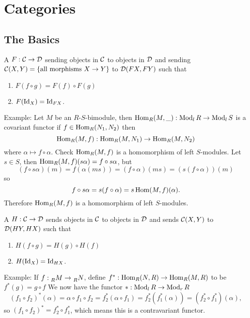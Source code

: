 \chapter{Categories}

\section{The Basics}

  \begin{define}
    A  $F:\mathcal{C}\to \mathcal{D}$ sending objects in $\mathcal{C}$ to objects
    in $\mathcal{D}$ and sending $\mathcal{C}(X,Y) = \{ \text{all morphisms } X\to Y\}$ to
    $\mathcal{D}(FX, FY)$ such that
    \begin{enumerate}
      \item $F(f\circ g) = F(f)\circ F(g)$
      \item $F(\operatorname{Id}_X) = \operatorname{Id}_{FX}$.
    \end{enumerate}
  \end{define}

  Example: Let $M$ be an $R$-$S$-bimodule, then
  $\operatorname{Hom}_R(M,\_): \operatorname{Mod}_l R\to \operatorname{Mod}_l S$ is a covariant functor if
  $f\in \operatorname{Hom}_R(N_1, N_2)$ then
  \[ \operatorname{Hom}_R(M,f): \operatorname{Hom}_R(M,N_1) \to \operatorname{Hom}_R(M, N_2) \]
  where $\alpha \mapsto f\circ \alpha$. Check $\operatorname{Hom}_R(M,f)$ is a homomorphism
  of left $S$-modules. Let $s \in S$, then
  $\operatorname{Hom}_R(M,f)(s\alpha) = f\circ s\alpha$, but
  \[ (f\circ s\alpha)(m) = f(\alpha(ms)) = (f\circ \alpha)(ms)
  = (s(f\circ\alpha))(m)\]
  so
  \[ f\circ s\alpha = s(f\circ \alpha) = s\operatorname{Hom}(M,f)(\alpha).\]
  Therefore $\operatorname{Hom}_R(M,f)$ is a homomorphism of left $S$-modules.

  \begin{define}
    A  $H:\mathcal{C} \to \mathcal{D}$ sends objects in $\mathcal{C}$ to
    objects in $\mathcal{D}$ and sends $\mathcal{C}(X,Y)$ to $\mathcal{D}(HY, HX)$ such that
    \begin{enumerate}
      \item $H(f\circ g) = H(g)\circ H(f)$
      \item $H(\operatorname{Id}_X) = \operatorname{Id}_{HX}$.
    \end{enumerate}
  \end{define}

  Example: If $f:\prescript{}{R}{M}\to \prescript{}{R}{N}$, define
  $f^*:\operatorname{Hom}_R(N,R) \to \operatorname{Hom}_R(M,R)$ to be $f^*(g) = g\circ f$
  We now have the functor $*:\operatorname{Mod}_l{R}\to \operatorname{Mod}_r{R}$
  \[ (f_1\circ f_2)^*(\alpha) = \alpha \circ f_1 \circ f_2
    = f_2^*(\alpha\circ f_1) = f_2^*(f_1^*(\alpha))
  = (f_2^*\circ f_1^*)(\alpha), \]
  so $(f_1\circ f_2)^* = f_2^*\circ f_1^*$, which means this is a contravariant
  functor.
